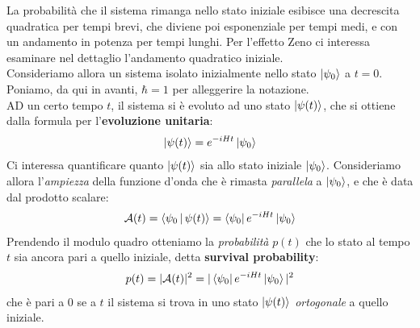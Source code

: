\documentclass[../../InformazioneQuantistica.tex]{subfiles}
\begin{document}
La probabilità che il sistema rimanga nello stato iniziale esibisce una decrescita quadratica per tempi brevi, che diviene poi esponenziale per tempi medi, e con un andamento in potenza per tempi lunghi. Per l'effetto Zeno ci interessa esaminare nel dettaglio l'andamento quadratico iniziale.\\

Consideriamo allora un sistema isolato inizialmente nello stato $\Ket{\psi_0}$ a $t=0$. Poniamo, da qui in avanti, $\hbar=1$ per alleggerire la notazione.\\
AD un certo tempo $t$, il sistema si è evoluto ad uno stato $\Ket{\psi(t)}$, che si ottiene dalla formula per l'\textbf{evoluzione unitaria}:
\begin{align}
\Ket{\psi(t)} = e^{-iHt}\Ket{\psi_0}
\label{eqn:ev-temp}
\end{align}
Ci interessa quantificare quanto $\Ket{\psi(t)}$ sia  allo stato iniziale $\Ket{\psi_0}$. Consideriamo allora l'\textit{ampiezza} della funzione d'onda che è rimasta \textit{parallela} a $\Ket{\psi_0}$, e che è data dal prodotto scalare:
\begin{align}
\mathcal{A}(t) = \Braket{\psi_0|\psi(t)} = \Bra{\psi_0}e^{-iHt}\Ket{\psi_0}
\label{eqn:surv-amplitude}
\end{align}
Prendendo il modulo quadro otteniamo la \textit{probabilità} $p(t)$ che lo stato al tempo $t$ sia ancora pari a quello iniziale, detta \textbf{survival probability}:
\begin{align}
p(t) = |\mathcal{A}(t)|^2 = |\Bra{\psi_0}e^{-iHt}\Ket{\psi_0}|^2
\label{eqn:surv-prob}
\end{align}
che è pari a $0$ se a $t$ il sistema si trova in uno stato $\Ket{\psi(t)}$ \textit{ortogonale} a quello iniziale.\\
\end{document}
